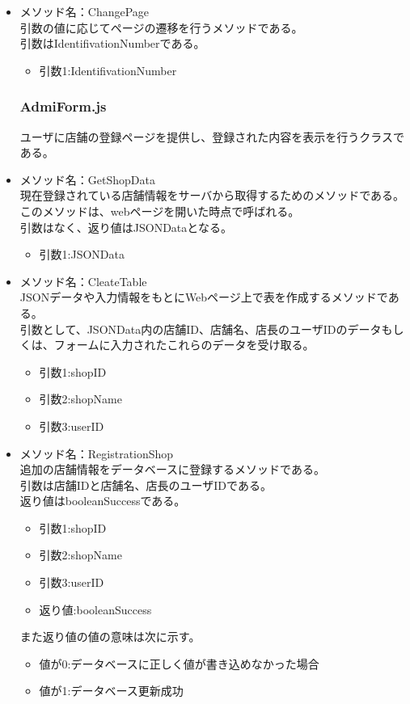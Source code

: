 \documentclass[a4j]{jarticle}
\begin{document}
\begin{itemize}
\item メソッド名：ChangePage\\

引数の値に応じてページの遷移を行うメソッドである。\\
引数はIdentifivationNumberである。

	\begin{itemize}
		\item 引数1:IdentifivationNumber
	\end{itemize}
\subsubsection{AdmiForm.js}
ユーザに店舗の登録ページを提供し、登録された内容を表示を行うクラスである。

\item メソッド名：GetShopData\\

現在登録されている店舗情報をサーバから取得するためのメソッドである。このメソッドは、webページを開いた時点で呼ばれる。\\
引数はなく、返り値はJSONDataとなる。
	\begin{itemize}
		\item 引数1:JSONData
	\end{itemize}

\item メソッド名：CleateTable\\
JSONデータや入力情報をもとにWebページ上で表を作成するメソッドである。\\
引数として、JSONData内の店舗ID、店舗名、店長のユーザIDのデータもしくは、フォームに入力されたこれらのデータを受け取る。
	\begin{itemize}
		\item 引数1:shopID
		\item 引数2:shopName
		\item 引数3:userID
	\end{itemize}
\item メソッド名：RegistrationShop\\

追加の店舗情報をデータベースに登録するメソッドである。\\
引数は店舗IDと店舗名、店長のユーザIDである。\\
返り値はbooleanSuccessである。
	\begin{itemize}
		\item 引数1:shopID
		\item 引数2:shopName
		\item 引数3:userID
		\item 返り値:booleanSuccess
	\end{itemize}
また返り値の値の意味は次に示す。
	\begin{itemize}
		\item 値が0:データベースに正しく値が書き込めなかった場合
		\item 値が1:データベース更新成功
	\end{itemize}



\end{itemize}
\end{document}
